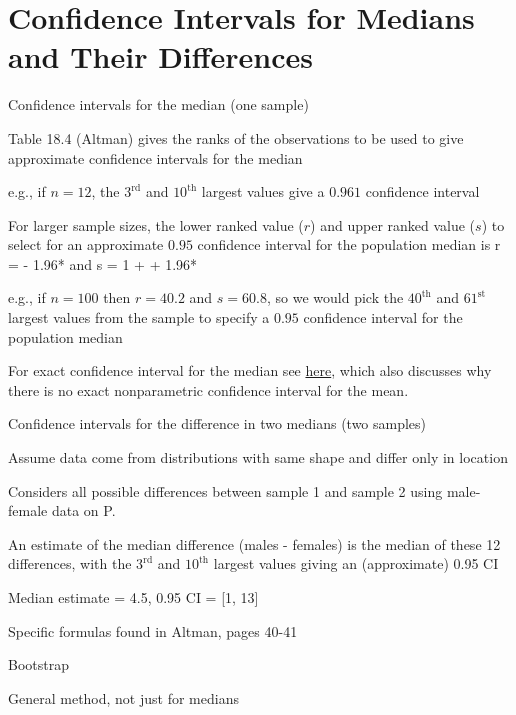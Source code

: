 \section{Confidence Intervals for Medians and Their Differences} 
\bi 
\item Confidence intervals for the median (one sample)
\bi 
\item Table 18.4 (Altman) gives the ranks of the observations to be
  used to give approximate confidence intervals for the median 
\item e.g., if $n = 12$, the $3^\textrm{rd}$ and $10^\textrm{th}$
  largest values give a $0.961$ confidence interval 
\item For larger sample sizes, the lower ranked value ($r$) and upper
  ranked value ($s$) to select for an approximate $0.95$ confidence
  interval for the population median is 
\beq
r =  - 1.96* \hspace{.4cm}\textrm{and}
\hspace{.4cm} s = 1 +  + 1.96* 
\eeq
\item e.g., if $n = 100$ then $r = 40.2$ and $s = 60.8$, so we would pick the $40^\textrm{th}$ and $61^\textrm{st}$ largest values from the sample to specify a $0.95$ confidence interval for the population median
\item For exact confidence interval for the median see
  \href{https://stats.stackexchange.com/questions/186957}{here}, which
  also discusses why there is no exact nonparametric confidence
  interval for the mean.
\ei
\item Confidence intervals for the difference in two medians (two samples)
\bi
\item Assume data come from distributions with same shape and differ only in location
\item Considers all possible differences between sample 1 and sample 2
  using male-female data on P.~\pageref{pg:nonpar-mf}
\item An estimate of the median difference (males - females) is the median of these 12 differences, with the $3^\textrm{rd}$ and $10^\textrm{th}$ largest values giving an (approximate) 0.95 CI
\item Median estimate = 4.5, 0.95 CI = [1, 13]
\item Specific formulas found in Altman, pages 40-41
\ei
\item Bootstrap 
\bi
\item General method, not just for medians
